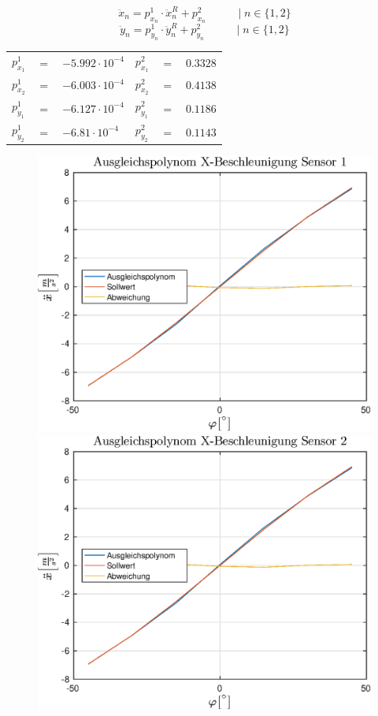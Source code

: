 \vspace*{-\baselineskip}
\begin{equation}
\ddot{x}_n = p^1_{x_n} \cdot \ddot{x}^R_n + p^2_{x_n} \hspace{35pt} \vert \hspace{3pt} n \in \{1, 2\}
\end{equation}
\begin{equation}
\ddot{y}_n = p^1_{y_n} \cdot \ddot{y}^R_n + p^2_{y_n} \hspace{35pt} \vert \hspace{3pt} n \in \{1, 2\}
\end{equation}
\vspace*{-\baselineskip}
\begin{table}[h]
\centering
\begin{tabular}{lcllcl}
$p^1_{x_1}$ &$=$& $-5.992 \cdot 10^{-4}$ & $p^2_{x_1}$ &$=$& $0.3328$ \\
$p^1_{x_2}$ &$=$& $-6.003 \cdot 10^{-4}$ & $p^2_{x_2}$ &$=$& $0.4138$ \\
$p^1_{y_1}$ &$=$& $-6.127 \cdot 10^{-4}$ & $p^2_{y_1}$ &$=$& $0.1186$ \\
$p^1_{y_2}$ &$=$& $-6.81 \cdot 10^{-4}$ & $p^2_{y_2}$ &$=$& $0.1143$ \\
\end{tabular}
\end{table}

\vspace*{-\baselineskip}
\begin{figure}[h]
	\includegraphics[width=0.5\linewidth]{img/X1__dd___fitted.eps}
	\includegraphics[width=0.5\linewidth]{img/X2__dd___fitted.eps}
\end{figure}

